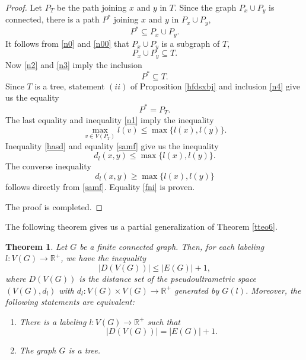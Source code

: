 \documentclass[pdflatex,sn-mathphys-num]{sn-jnl}%
\theoremstyle{thmstyleone}%
\newtheorem{Theorem}{Theorem}[section]
\theoremstyle{thmstyletwo}%
\theoremstyle{thmstylethree}%
\theoremstyle{thmstyletwo}%
\theoremstyle{thmstylethree}%
\begin{document}
\begin{proof}
Let $P_T$ be the path joining $x$ and $y$ in $T$. Since the graph $P_x \cup P_y$ is connected, there is a path $P^*$ joining $x$ and $y$ in $P_x \cup P_y$,
\begin{equation}
    \label{n2}
P^* \subseteq P_x \cup P_y.
\end{equation}
It follows from \eqref{n0}  and \eqref{n00} that $P_x \cup P_y$ is a subgraph of $T$,
\begin{equation}
\label{n3}
P_x \cup P_y \subseteq T. 
\end{equation}
Now \eqref{n2} and \eqref{n3} imply the inclusion
\begin{equation}
\label{n4}
P^* \subseteq T. 
\end{equation}
Since $T$ is a tree, statement $(ii)$ of Proposition \ref{hfdsxbj} and inclusion \eqref{n4} give us the equality
\[
P^* = P_T.
\]
The last equality and inequality \eqref{n1} imply the inequality 
\begin{equation}
    \label{hasd}
\max_{v \in V(P_T)} l(v)\leq \max \{l(x),l(y)\}.
\end{equation}
Inequality \eqref{hasd} and equality \eqref{samf} give us the inequality
\[
d_l(x,y) \le \max \{ l(x), l(y) \}.
\]
The converse inequality
\[
d_l(x,y) \ge \max \{ l(x), l(y) \}
\]
follows directly from \eqref{samf}.
Equality \eqref{fni} is proven.

The proof is completed. 

\end{proof}





The following theorem gives us a partial generalization of Theorem \ref{tteo6}.


\begin{Theorem}\label{mak} Let $G$ be a finite connected graph. Then, for each labeling
$l: V(G) \to \mathbb{R}^+$, we have the inequality
\begin{equation}
    \label{h1}
|D(V(G))| \le |E(G)| + 1,
\end{equation}
where $D(V(G))$ is the distance set of the pseudoultrametric space $(V(G), d_l)$ with $d_l : V(G)\times V(G) \to \mathbb R^+$ generated by $G(l)$. Moreover,
the following statements are equivalent:
\begin{enumerate}
    \item[(i)] There is a labeling $l : V(G) \to \mathbb{R}^+$ such that
\begin{equation}
    \label{h2}
|D(V(G))| = |E(G)| + 1.
\end{equation}
\item[(ii)] The graph $G$ is a tree.
\end{enumerate}
\end{Theorem}
\end{document}
